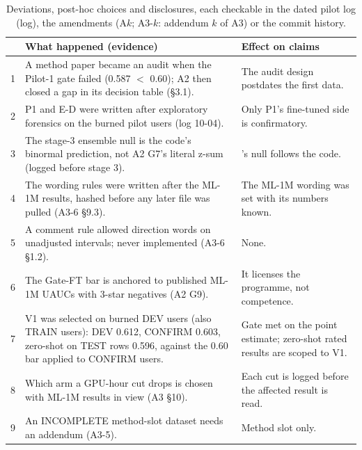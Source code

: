 \begin{table}[!htbp]
\caption{Deviations, post-hoc choices and disclosures, each checkable in the dated pilot log (log), the amendments (A$k$; A3-$k$:
addendum $k$ of A3) or the commit history.}
\label{tab:deviations}
\centering\scriptsize\setlength{\tabcolsep}{2.5pt}\renewcommand{\arraystretch}{0.88}
\begin{tabular}{@{}r>{\raggedright\arraybackslash}p{}>{\raggedright\arraybackslash}p{}@{}}
\toprule
 & What happened (evidence) & Effect on claims\\
\midrule
1 & A method paper became an audit when the Pilot-1 gate failed (0.587 $<$ 0.60); A2 then closed a gap in its decision table (\S3.1). & The audit design postdates the first data.\\
2 & P1 and E-D were written after exploratory forensics on the burned pilot users (log 10-04). & Only P1's fine-tuned side is confirmatory.\\
3 & The stage-3 ensemble null is the code's binormal prediction, not A2 G7's literal z-sum (logged before stage 3). & \method{}'s null follows the code.\\
4 & The wording rules were written after the ML-1M results, hashed before any later file was pulled (A3-6 \S9.3). & The ML-1M wording was set with its numbers known.\\
5 & A comment rule allowed direction words on unadjusted intervals; never implemented (A3-6 \S1.2). & None.\\
6 & The Gate-FT bar is anchored to published ML-1M UAUCs with 3-star negatives (A2 G9). & It licenses the programme, not competence.\\
7 & V1 was selected on burned DEV users (also TRAIN users): DEV 0.612, CONFIRM 0.603, zero-shot on TEST rows 0.596, against the 0.60 bar applied to CONFIRM users. & Gate met on the point estimate; zero-shot rated results are scoped to V1.\\
8 & Which arm a GPU-hour cut drops is chosen with ML-1M results in view (A3 \S10). & Each cut is logged before the affected result is read.\\
9 & An INCOMPLETE method-slot dataset needs an addendum (A3-5). & Method slot only.\\

\end{tabular}
\end{table}
